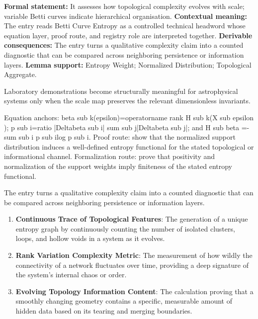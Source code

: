 \begingroup\footnotesize\setlength{\emergencystretch}{3em}\sloppy
\textbf{Formal statement:} It assesses how topological complexity evolves with scale; variable Betti curves indicate hierarchical organisation. \textbf{Contextual meaning:} The entry reads Betti Curve Entropy as a controlled technical headword whose equation layer, proof route, and registry role are interpreted together. \textbf{Derivable consequences:} The entry turns a qualitative complexity claim into a counted diagnostic that can be compared across neighboring persistence or information layers. \textbf{Lemma support:} Entropy Weight; Normalized Distribution; Topological Aggregate.\par
\endgroup

Laboratory demonstrations become structurally meaningful for astrophysical systems only when the scale map preserves the relevant dimensionless invariants.

Equation anchors: beta sub k(epsilon)=operatorname rank H sub k(X sub epsilon ); p sub i=ratio |Deltabeta sub i| sum sub j|Deltabeta sub j|; and H sub beta =-sum sub i p sub ilog p sub i. Proof route: show that the normalized support distribution induces a well-defined entropy functional for the stated topological or informational channel. Formalization route: prove that positivity and normalization of the support weights imply finiteness of the stated entropy functional.

The entry turns a qualitative complexity claim into a counted diagnostic that can be compared across neighboring persistence or information layers.
\endgroup

\begin{enumerate}[leftmargin=1.6em,itemsep=6pt,topsep=4pt]
\item \textbf{Continuous Trace of Topological Features}: The generation of a unique entropy graph by continuously counting the number of isolated clusters, loops, and hollow voids in a system as it evolves.
\item \textbf{Rank Variation Complexity Metric}: The measurement of how wildly the connectivity of a network fluctuates over time, providing a deep signature of the system's internal chaos or order.
\item \textbf{Evolving Topology Information Content}: The calculation proving that a smoothly changing geometry contains a specific, measurable amount of hidden data based on its tearing and merging boundaries.
\end{enumerate}

